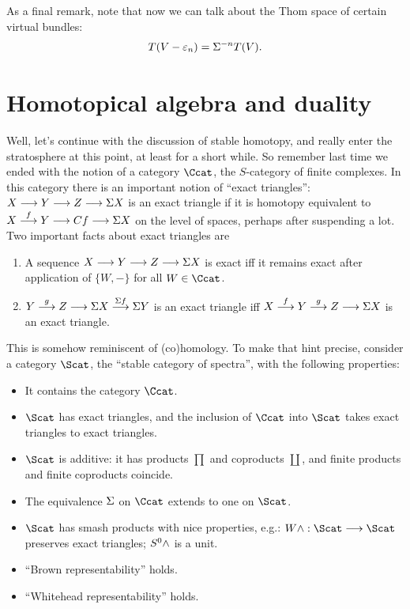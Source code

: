 As a final remark, note that now we can talk about the Thom space of certain virtual bundles: \[T(V - \varepsilon_n) = \Sigma^{-n} T(V).\]

\fi
\BoxedNote{}







\section{Homotopical algebra and duality} %
\label{HomotopicalAlgebraAndDuality}
\ifx\OutputHomotopicalAlgebraAndDuality\undefined\else
Well, let's continue with the discussion of stable homotopy, and really enter the stratosphere at this point, at least for a short while.  So remember last time we ended with the notion of a category $\Ccat$, the $S$-category of finite complexes.  In this category there is an important notion of ``exact triangles'': $X \longrightarrow Y \longrightarrow Z \longrightarrow \Sigma X$ is an exact triangle if it is homotopy equivalent to $X \stackrel{f}{\longrightarrow} Y \longrightarrow Cf \longrightarrow \Sigma X$ on the level of spaces, perhaps after suspending a lot.  Two important facts about exact triangles are
\begin{enumerate}
\item A sequence $X \longrightarrow Y \longrightarrow Z \longrightarrow \Sigma X$ is exact iff it remains exact after application of $\{W, -\}$ for all $W \in \Ccat$.
\item $Y \stackrel{g}{\longrightarrow} Z \longrightarrow \Sigma X \stackrel{\Sigma f}{\longrightarrow} \Sigma Y$ is an exact triangle iff $X \stackrel{f}{\longrightarrow} Y \stackrel{g}{\longrightarrow} Z \longrightarrow \Sigma X$ is an exact triangle.
\end{enumerate}
This is somehow reminiscent of (co)homology. To make that hint precise, consider a category $\Scat$, the ``stable category of spectra'', with the following properties:
\begin{itemize}
\item It contains the category $\Ccat$.
\item $\Scat$ has exact triangles, and the inclusion of $\Ccat$ into $\Scat$ takes exact triangles to exact triangles.
\item $\Scat$ is additive: it has products $\prod$ and coproducts $\coprod$, and finite products and finite coproducts coincide.
\item The equivalence $\Sigma$ on $\Ccat$ extends to one on $\Scat$.
\item $\Scat$ has smash products with nice properties, e.g.: $W \sprod: \Scat \to \Scat$ preserves exact triangles; $S^0 \wedge$ is a unit.
\item ``Brown representability'' holds.
\item ``Whitehead representability'' holds.
\end{itemize}

